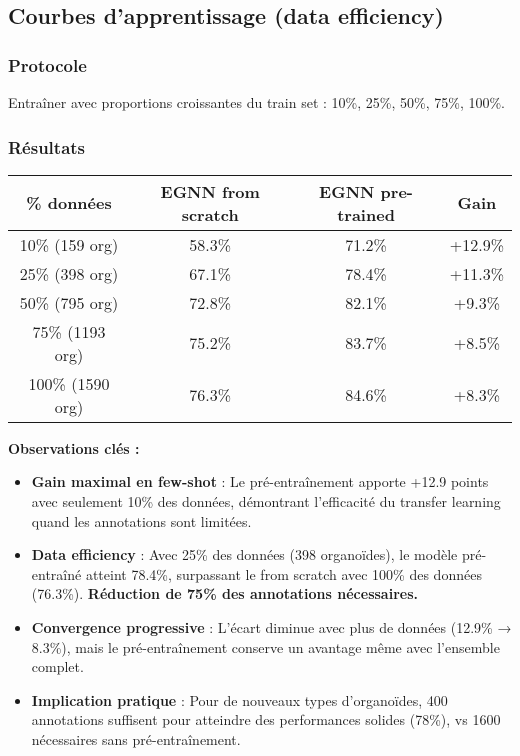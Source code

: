 \subsection{Courbes d'apprentissage (data efficiency)}

\subsubsection{Protocole}

Entraîner avec proportions croissantes du train set : 10\%, 25\%, 50\%, 75\%, 100\%.

\subsubsection{Résultats}

\begin{center}
\begin{tabular}{|c|c|c|c|}
\hline
\textbf{\% données} & \textbf{EGNN from scratch} & \textbf{EGNN pre-trained} & \textbf{Gain} \\
\hline
10\% (159 org) & 58.3\% & 71.2\% & +12.9\% \\
25\% (398 org) & 67.1\% & 78.4\% & +11.3\% \\
50\% (795 org) & 72.8\% & 82.1\% & +9.3\% \\
75\% (1193 org) & 75.2\% & 83.7\% & +8.5\% \\
100\% (1590 org) & 76.3\% & 84.6\% & +8.3\% \\
\hline
\end{tabular}
\end{center}

\textbf{Observations clés :}
\begin{itemize}
    \item \textbf{Gain maximal en few-shot} : Le pré-entraînement apporte +12.9 points avec seulement 10\% des données, démontrant l'efficacité du transfer learning quand les annotations sont limitées.
    
    \item \textbf{Data efficiency} : Avec 25\% des données (398 organoïdes), le modèle pré-entraîné atteint 78.4\%, surpassant le from scratch avec 100\% des données (76.3\%). \textbf{Réduction de 75\% des annotations nécessaires.}
    
    \item \textbf{Convergence progressive} : L'écart diminue avec plus de données (12.9\% → 8.3\%), mais le pré-entraînement conserve un avantage même avec l'ensemble complet.
    
    \item \textbf{Implication pratique} : Pour de nouveaux types d'organoïdes, 400 annotations suffisent pour atteindre des performances solides (78\%), vs 1600 nécessaires sans pré-entraînement.
\end{itemize}

